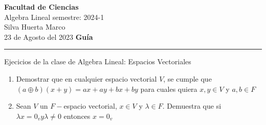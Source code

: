 \documentclass[a4paper,12pt]{article}
\begin{document}
\pagecolor{black}
\color{white}

\thispagestyle{firstpage} %
\noindent
\large\textbf{Facultad de Ciencias}  \\
Algebra Lineal                \hfill semestre: 2024-1 \\
Silva Huerta Marco            \hfill  \\ %
23 de Agosto del 2023         \hfill \textbf{Guía}    \\
\noindent\rule{7.3in}{2.8pt}

\vspace{5mm}
\begin{center}
    Ejecicios de la clase de Algebra Lineal: Espacios Vectoriales
\end{center}

\begin{enumerate}
    \item Demostrar que en cualquier espacio vectorial $V$, se cumple que $(a \oplus b) (x + y) = ax + ay + bx + by$ para cuales quiera $x,y \in V$ y $a, b \in F$
    \item Sean $V$ un $F-$espacio vectorial, $x \in V$ y $\lambda \in F. $ Demuestra que si $\lambda x = 0_{v} y \lambda \neq 0 $ entonces $x = 0_{v}$
\end{enumerate}



\end{document}
